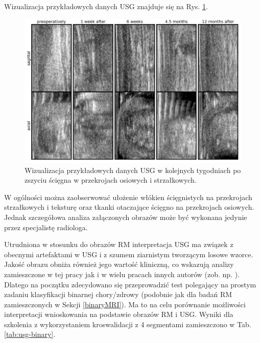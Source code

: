 Wizualizacja przykładowych danych USG znajduje się na Rys. \ref{fig:US_sample}.
\begin{figure}[h!]
	\includegraphics[width=\textwidth]{figures/Data_US_sample.png}
	\caption{Wizualizacja przykładowych danych USG w kolejnych tygodniach po zszyciu ścięgna w przekrojach osiowych i strzałkowych.}
	\label{fig:US_sample}
\end{figure}
W ogólności można zaobserwować ułożenie włókien ścięgnistych na przekrojach strzałkowych i teksturę oraz tkanki otaczające ścięgno na przekrojach osiowych. Jednak szczegółowa analiza załączonych obrazów może być wykonana jedynie przez specjalistę radiologa. 

Utrudniona w stosunku do obrazów RM interpretacja USG ma związek z obecnymi artefaktami w USG i z szumem ziarnistym tworzącym losowe wzorce. Jakość obrazu obniża również jego wartość kliniczną, co wskazują analizy zamieszczone w tej pracy jak i w wielu pracach innych autorów (zob. np. \cite{Khan2003, Ibrahim2013}). Dlatego na początku zdecydowano się przeprowadzić test polegający na prostym zadaniu klasyfikacji binarnej chory/zdrowy (podobnie jak dla badań RM zamieszczonych w Sekcji \ref{binaryMRI}). Ma to na celu porównanie możliwości interpretacji wnioskowania na podstawie obrazów RM i USG. Wyniki dla szkolenia z wykorzystaniem kroswalidacji z 4 segmentami zamieszczono w Tab. \ref{tab:usg-binary}.

